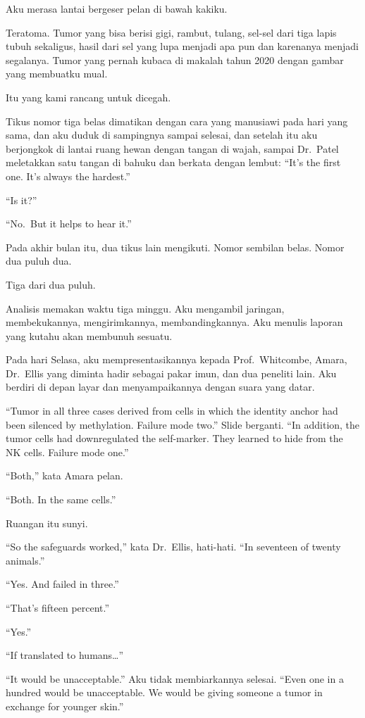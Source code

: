 \documentclass[11pt,twoside,openany]{book}
\makeatletter
\newcommand{\scenebreak}{\par\vspace{0.9em}{\centering\textsc{*\hspace{0.7em}*\hspace{0.7em}*}\par}\vspace{0.9em}\@afterindentfalse\@afterheading}
\makeatother
\begin{document}
Aku merasa lantai bergeser pelan di bawah kakiku.

Teratoma. Tumor yang bisa berisi gigi, rambut, tulang, sel-sel dari tiga lapis tubuh sekaligus, hasil dari sel yang lupa menjadi apa pun dan karenanya menjadi segalanya. Tumor yang pernah kubaca di makalah tahun 2020 dengan gambar yang membuatku mual.

Itu yang kami rancang untuk dicegah.

Tikus nomor tiga belas dimatikan dengan cara yang manusiawi pada hari yang sama, dan aku duduk di sampingnya sampai selesai, dan setelah itu aku berjongkok di lantai ruang hewan dengan tangan di wajah, sampai Dr.~Patel meletakkan satu tangan di bahuku dan berkata dengan lembut: ``It's the first one. It's always the hardest.''

``Is it?''

``No.~But it helps to hear it.''

Pada akhir bulan itu, dua tikus lain mengikuti. Nomor sembilan belas. Nomor dua puluh dua.

Tiga dari dua puluh.

\scenebreak
Analisis memakan waktu tiga minggu. Aku mengambil jaringan, membekukannya, mengirimkannya, membandingkannya. Aku menulis laporan yang kutahu akan membunuh sesuatu.

Pada hari Selasa, aku mempresentasikannya kepada Prof.~Whitcombe, Amara, Dr.~Ellis yang diminta hadir sebagai pakar imun, dan dua peneliti lain. Aku berdiri di depan layar dan menyampaikannya dengan suara yang datar.

``Tumor in all three cases derived from cells in which the identity anchor had been silenced by methylation. Failure mode two.'' Slide berganti. ``In addition, the tumor cells had downregulated the self-marker. They learned to hide from the NK cells. Failure mode one.''

``Both,'' kata Amara pelan.

``Both. In the same cells.''

Ruangan itu sunyi.

``So the safeguards worked,'' kata Dr.~Ellis, hati-hati. ``In seventeen of twenty animals.''

``Yes. And failed in three.''

``That's fifteen percent.''

``Yes.''

``If translated to humans\ldots{}''

``It would be unacceptable.'' Aku tidak membiarkannya selesai. ``Even one in a hundred would be unacceptable. We would be giving someone a tumor in exchange for younger skin.''
\end{document}
